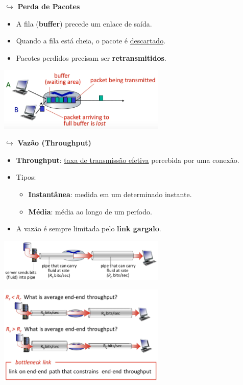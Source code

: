         $\hookrightarrow$ \textbf{Perda de Pacotes}
        \begin{itemize}
            \item A fila (\textbf{buffer}) precede um enlace de saída.
            \item Quando a fila está cheia, o pacote é \underline{descartado}.
            \item Pacotes perdidos precisam ser \textbf{retransmitidos}.
        \end{itemize}

        \begin{center}
            \includegraphics[width=0.6\textwidth]{img/cap-01/perda-de-pacotes.png}
        \end{center}

        $\hookrightarrow$ \textbf{Vazão (Throughput)}
        \begin{itemize}
            \item \textbf{Throughput}: \underline{taxa de transmissão efetiva} percebida por uma conexão.
            \item Tipos:
            \begin{itemize}
                \item \textbf{Instantânea}: medida em um determinado instante.
                \item \textbf{Média}: média ao longo de um período.
            \end{itemize}
            \item A vazão é sempre limitada pelo \textbf{link gargalo}.
        \end{itemize}

        \begin{center}
            \includegraphics[width=0.6\textwidth]{img/cap-01/vazao.png}
        \end{center}

        \begin{center}
            \includegraphics[width=0.6\textwidth]{img/cap-01/exemplo-vazao.png}
        \end{center}

